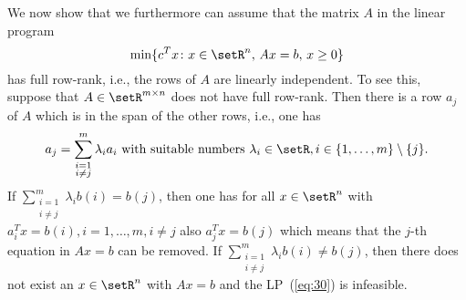 We now show that  we furthermore can assume that the matrix $A$ in the
linear  program 
\begin{equation}
  \label{eq:30}
  \min\{c^Tx \colon x \in \setR^n, \, Ax =b,\, x\geq0\}
\end{equation}
has full row-rank, i.e., the rows of $A$ are linearly independent. 
To see this, suppose that $A\in \setR^{m\times n}$ does not have full row-rank. Then
there is a row $a_j$ of $A$ which is in the span of the other rows,
i.e., one has
\begin{displaymath}
  a_j = \sum_{\substack{i=1\\ i\neq j}}^m \lambda_i a_i \text{ with suitable numbers }
  \lambda_i \in \setR, i\in \{1,\ldots,m\} \setminus\{j\}. 
\end{displaymath}
If $\sum_{\substack{i=1\\ i\neq j}}^m \lambda_i  b(i) = b(j)$, then one has for all  $x \in \setR^n$
with 
$a_i^Tx = b(i), i=1,\ldots,m, i\neq j$ also  $a_j^Tx =  b(j)$ which means that the
$j$-th  equation in  $Ax = b$ can be removed. 
If $\sum_{\substack{i=1\\ i\neq j}}^m \lambda_i  b(i) \neq b(j)$, then there does not exist an $x \in
\setR^n$ with $Ax = b$ and the  LP~(\ref{eq:30}) is infeasible. 

